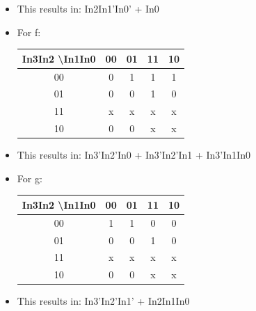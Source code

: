 \begin{itemize}
  \item This results in: In2In1'In0' + In0

  \item For f:

    \begin{center}
      \begin{tabular}[h!]{|c | c | c | c | c |}
        \hline
        In3In2 \textbackslash  In1In0 & 00 & 01 & 11 & 10\\
        \hline
        00 & 0 & 1 & 1 & 1\\
        \hline
        01 & 0 & 0 & 1 & 0\\
        \hline
        11 & x & x & x & x\\
        \hline
        10 & 0 & 0 & x & x\\
        \hline
      \end{tabular}
    \end{center}

  \item This results in: In3'In2'In0 + In3'In2'In1 + In3'In1In0

  \item For g:

    \begin{center}
      \begin{tabular}[h!]{|c | c | c | c | c |}
        \hline
        In3In2 \textbackslash  In1In0 & 00 & 01 & 11 & 10\\
        \hline
        00 & 1 & 1 & 0 & 0\\
        \hline
        01 & 0 & 0 & 1 & 0\\
        \hline
        11 & x & x & x & x\\
        \hline
        10 & 0 & 0 & x & x\\
        \hline
      \end{tabular}
    \end{center}

  \item This results in: In3'In2'In1' + In2In1In0

\end{itemize}



